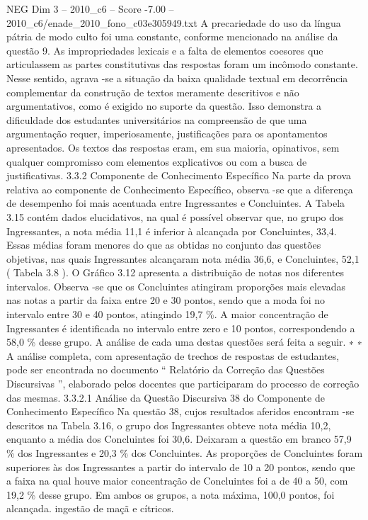 \begin{textsample}{NEG Dim 3 – 2010\_c6 – Score -7.00 – 2010\_c6/enade\_2010\_fono\_c03e305949.txt}
A precariedade do uso da língua pátria de modo culto foi uma constante, conforme mencionado na análise da questão 9.
As impropriedades lexicais e a falta de elementos coesores que articulassem as partes constitutivas das respostas foram um incômodo constante.
Nesse sentido, agrava -se a situação da baixa qualidade textual em decorrência complementar da construção de textos meramente descritivos e não argumentativos, como é exigido no suporte da questão.
Isso demonstra a dificuldade dos estudantes universitários na compreensão de que uma argumentação requer, imperiosamente, justificações para os apontamentos apresentados.
Os textos das respostas eram, em sua maioria, opinativos, sem qualquer compromisso com elementos explicativos ou com a busca de justificativas. 3.3.2 Componente de Conhecimento Específico Na parte da prova relativa ao componente de Conhecimento Específico, observa -se que a diferença de desempenho foi mais acentuada entre Ingressantes e Concluintes.
A Tabela 3.15 contém dados elucidativos, na qual é possível observar que, no grupo dos Ingressantes, a nota média 11,1 é inferior à alcançada por Concluintes, 33,4.
Essas médias foram menores do que as obtidas no conjunto das questões objetivas, nas quais Ingressantes alcançaram nota média 36,6, e Concluintes, 52,1 ( Tabela 3.8 ).
O Gráfico 3.12 apresenta a distribuição de notas nos diferentes intervalos.
Observa -se que os Concluintes atingiram proporções mais elevadas nas notas a partir da faixa entre 20 e 30 pontos, sendo que a moda foi no intervalo entre 30 e 40 pontos, atingindo 19,7 \%.
A maior concentração de Ingressantes é identificada no intervalo entre zero e 10 pontos, correspondendo a 58,0 \% desse grupo.
A análise de cada uma destas questões será feita a seguir. ∗ ∗ A análise completa, com apresentação de trechos de respostas de estudantes, pode ser encontrada no documento “ Relatório da Correção das Questões Discursivas ”, elaborado pelos docentes que participaram do processo de correção das mesmas. 3.3.2.1 Análise da Questão Discursiva 38 do Componente de Conhecimento Específico Na questão 38, cujos resultados aferidos encontram -se descritos na Tabela 3.16, o grupo dos Ingressantes obteve nota média 10,2, enquanto a média dos Concluintes foi 30,6.
Deixaram a questão em branco 57,9 \% dos Ingressantes e 20,3 \% dos Concluintes.
As proporções de Concluintes foram superiores às dos Ingressantes a partir do intervalo de 10 a 20 pontos, sendo que a faixa na qual houve maior concentração de Concluintes foi a de 40 a 50, com 19,2 \% desse grupo.
Em ambos os grupos, a nota máxima, 100,0 pontos, foi alcançada. ingestão de maçã e cítricos.

\end{textsample}
